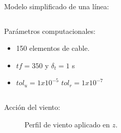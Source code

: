 \documentclass[
  aspectratio=169,
]{beamer}
\begin{document}
\begin{small}
\begin{frame}[t]{Modelo simplificado de una línea:}
\begin{columns}[T,onlytextwidth]
\begin{column}{.4\textwidth}
\begin{onlyenv}
\begin{minipage}{\textwidth}
\begin{block}{Parámetros computacionales:}
\begin{itemize}
						\item 150 elementos de cable. 
						\item $tf= 350$ y $\delta_t = 1$ s
						\item $tol_u =1$$x10^{-5} $ $tol_r =1x10^{-7} $   
					\end{itemize}	 
				\end{block}
			\end{minipage}
		\end{onlyenv}
		\end{column}
	\end{columns}
\end{frame}

\begin{frame}{Acción del viento:}
	\begin{figure}[htbp]
		\centering
		\caption{Perfil de viento aplicado en $z$.}
	\end{figure}
\end{frame}



\end{small}
\end{document}
